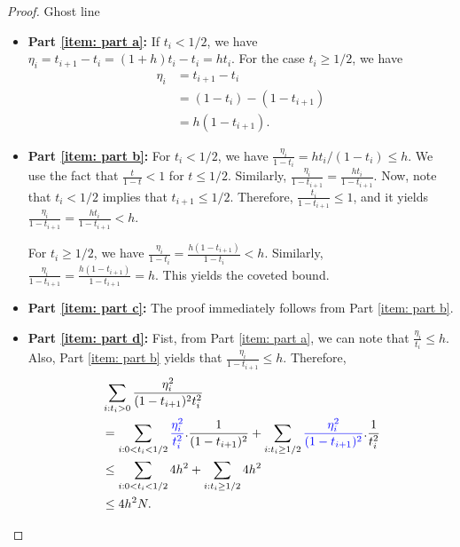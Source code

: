 \documentclass[10pt,a4paper]{amsart}
\newcommand{\blue}[1]{{\color{blue}#1}}
\begin{document}
\begin{proof}
{\color{white} Ghost line}
\begin{itemize}
    \item \textbf{Part \ref{item: part a}:} If $t_i < 1/2$, we have $\eta_i = t_{i+1} - t_i = (1+h)t_i - t_i = h t_i$. For the case $t_{i}\ge 1/2$, we have 
    \begin{align*}
        \eta_i &= t_{i+1} - t_i\\
        & = (1- t_i) - (1 - t_{i+1})\\
        & = h (1- t_{i+1}).
    \end{align*}

    \item \textbf{Part \ref{item: part b}:} For $t_i < 1/2$, we have $\frac{\eta_i}{1 - t_i} = ht_i/(1-t_i) \le h$. We use the fact that $\frac{t}{1-t}<1$ for $t \le 1/2$. Similarly, $\frac{\eta_i}{1 - t_{i+1}} = \frac{h t_i}{1 - t_{i+1}}$. Now, note that $t_i <1/2$ implies that $t_{i+1} \le 1/2$. Therefore, $\frac{t_i}{1 - t_{i+1}}\le 1$, and it yields $\frac{\eta_i}{1 - t_{i+1}} = \frac{h t_i}{1 - t_{i+1}} < h$.
    
    For $t_i\ge 1/2$, we have $\frac{\eta_i}{1-t_i} = \frac{h(1- t_{i+1})}{1 - t_i} < h$. Similarly, $\frac{\eta_i}{1-t_{i+1}} = \frac{h(1- t_{i+1})}{1 - t_{i+1}} = h$. This yields the coveted bound.

    \item \textbf{Part \ref{item: part c}:} The proof immediately follows from Part \ref{item: part b}.


    \item \textbf{Part \ref{item: part d}:} Fist, from Part \ref{item: part a}, we can note that $\frac{\eta_{i}}{t_i} \le h$. Also, Part \ref{item: part b} yields that $\frac{\eta_i}{1 - t_{i+1}} \le h$. Therefore, 
    \begin{align*}
        & \sum_{i : t_i >0}\frac{ \eta_i^2 }{(1-t_{i+1})^2 t_i^2}\\
        & = \sum_{i: 0 < t_{i} < 1/2 } \blue{\frac{ \eta_i^2 }{ t_i^2}}. \frac{1}{(1-t_{i+1})^2} + \sum_{i: t_{i}\ge 1/2 } \blue{\frac{ \eta_i^2 }{(1-t_{i+1})^2 }}. \frac{1}{t_i^2} \\
        & \le \sum_{i: 0 < t_{i} < 1/2 } 4 h^2 + \sum_{i: t_{i}\ge 1/2 } 4 h^2\\
        & \le 4h^2 N.
    \end{align*}
\end{itemize}
    

    


    


\end{proof}
\end{document}
